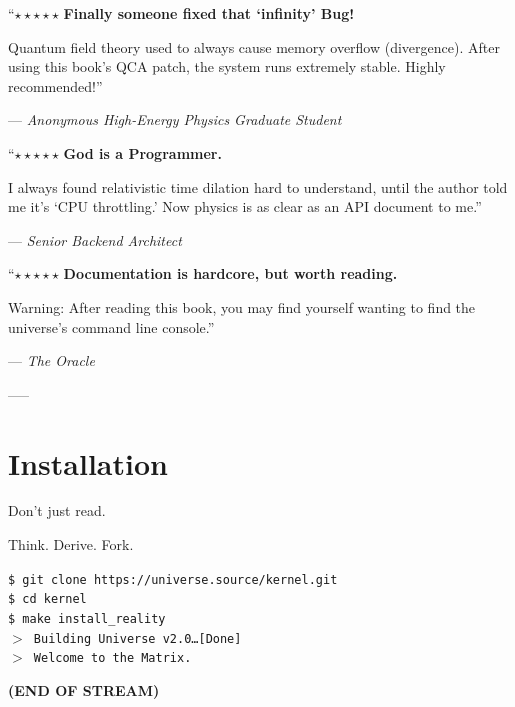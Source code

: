 ``$\star\star\star\star\star$ \textbf{Finally someone fixed that `infinity' Bug!}

Quantum field theory used to always cause memory overflow (divergence). After using this book's QCA patch, the system runs extremely stable. Highly recommended!''

--- \textit{Anonymous High-Energy Physics Graduate Student}

``$\star\star\star\star\star$ \textbf{God is a Programmer.}

I always found relativistic time dilation hard to understand, until the author told me it's `CPU throttling.' Now physics is as clear as an API document to me.''

--- \textit{Senior Backend Architect}

``$\star\star\star\star\star$ \textbf{Documentation is hardcore, but worth reading.}

Warning: After reading this book, you may find yourself wanting to find the universe's command line console.''

--- \textit{The Oracle}

-----

\section{Installation}

Don't just read.

Think. Derive. Fork.

\texttt{\$ git clone https://universe.source/kernel.git} \\
\texttt{\$ cd kernel} \\
\texttt{\$ make install\_reality} \\
\texttt{$>$ Building Universe v2.0\ldots [Done]} \\
\texttt{$>$ Welcome to the Matrix.}

\textbf{(END OF STREAM)}

